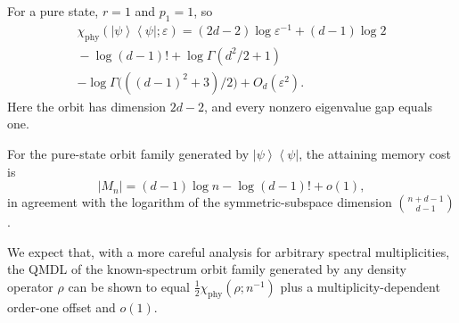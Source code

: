 \documentclass[aps,prl,twocolumn,superscriptaddress,amsmath,amssymb,reprint,longbibliography]{revtex4-2}
\newcommand{\ketbra}[2]{\left|#1\right\rangle\!\!\left\langle #2\right|}
\def\eps{\varepsilon}
\begin{document}
For a pure state, $r=1$ and $p_1=1$, so
\begin{multline}
    \chi_\mathrm{phy}(\ketbra{\psi}{\psi};\eps)
    =(2d-2)\log \eps^{-1}
    +(d-1)\log2\\
    {}-\log(d-1)!+\log\Gamma(d^2/2+1)\\
    -\log\Gamma\bigl(((d-1)^2+3)/2\bigr)+O_d(\eps^2).
\end{multline}
Here the orbit has dimension $2d-2$, and every nonzero eigenvalue gap equals one.

For the pure-state orbit family generated by $\ketbra{\psi}{\psi}$, the attaining memory cost is
\begin{equation}
    |M_n|=(d-1)\log n-\log(d-1)!+o(1),
\end{equation}
in agreement with the logarithm of the symmetric-subspace dimension $\binom{n+d-1}{d-1}$.

We expect that, with a more careful analysis for arbitrary spectral multiplicities, the QMDL of the known-spectrum orbit family generated by any density operator $\rho$ can be shown to equal $\frac12\chi_\mathrm{phy}(\rho;n^{-1})$ plus a multiplicity-dependent order-one offset and $o(1)$.
\end{document}
